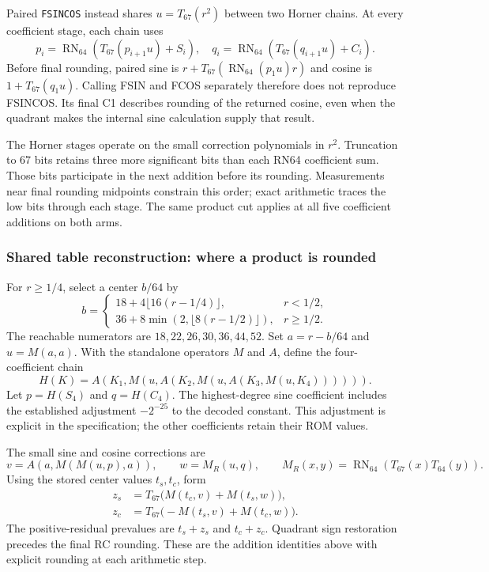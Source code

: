 \documentclass[11pt]{article}
\newcommand{\ins}[1]{\texttt{#1}}
\newcommand{\N}[1]{\operatorname{RN}_{#1}}
\begin{document}
Paired \ins{FSINCOS} instead shares $u=T_{67}(r^2)$ between two Horner
chains. At every coefficient stage, each chain uses
\begin{equation}
 p_i=\N{64}\!\left(T_{67}(p_{i+1}u)+S_i\right),
 \quad
 q_i=\N{64}\!\left(T_{67}(q_{i+1}u)+C_i\right).
\end{equation}
Before final rounding, paired sine is $r+T_{67}(\N{64}(p_1u)r)$ and cosine
is $1+T_{67}(q_1u)$. Calling FSIN and FCOS separately therefore does not
reproduce FSINCOS. Its final C1 describes rounding of the returned cosine,
even when the quadrant makes the internal sine calculation supply that result.

The Horner stages operate on the small correction polynomials in $r^2$.
Truncation to 67 bits retains three more significant bits than each RN64
coefficient sum. Those bits participate in the next addition before its
rounding. Measurements near final rounding midpoints constrain this order;
exact arithmetic traces the low bits through each stage. The same product
cut applies at all five coefficient additions on both arms.

\subsubsection{Shared table reconstruction: where a product is rounded}
\label{sec:trig-table}

For $r\geq1/4$, select a center $b/64$ by
\begin{equation}
 b=\begin{cases}
 18+4\lfloor16(r-1/4)\rfloor,&r<1/2,\\
 36+8\min(2,\lfloor8(r-1/2)\rfloor),&r\geq1/2.
 \end{cases}
\end{equation}
The reachable numerators are $18,22,26,30,36,44,52$. Set $a=r-b/64$
and $u=M(a,a)$. With the standalone operators $M$ and $A$, define the
four-coefficient chain
\begin{equation}
 H(K)=A(K_1,M(u,A(K_2,M(u,A(K_3,M(u,K_4)))))).
\end{equation}
Let $p=H(S_4)$ and $q=H(C_4)$. The highest-degree sine coefficient includes
the established adjustment $-2^{-25}$ to the decoded constant. This adjustment
is explicit in the specification; the other coefficients retain their ROM
values.

The small sine and cosine corrections are
\begin{equation}
 v=A(a,M(M(u,p),a)),\qquad
 w=M_R(u,q),\qquad M_R(x,y)=\N{64}(T_{67}(x)T_{64}(y)).
\end{equation}
Using the stored center values $t_s,t_c$, form
\begin{align}
 z_s&=T_{67}\bigl(M(t_c,v)+M(t_s,w)\bigr),\\
 z_c&=T_{67}\bigl(-M(t_s,v)+M(t_c,w)\bigr).
\end{align}
The positive-residual prevalues are $t_s+z_s$ and $t_c+z_c$. Quadrant sign
restoration precedes the final RC rounding. These are the addition identities
above with explicit rounding at each arithmetic step.
\end{document}
